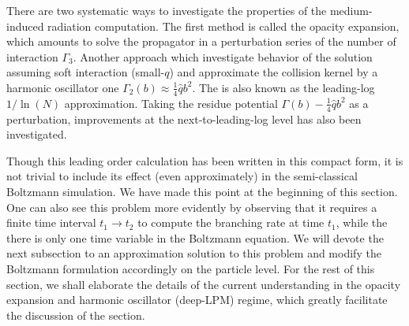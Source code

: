 There are two systematic ways to investigate the properties of the medium-induced radiation computation.
The first method is called the opacity expansion, which amounts to solve the propagator in a perturbation series of the number of interaction $\Gamma_3$. 
Another approach which investigate behavior of the solution assuming soft interaction (small-$q$) and approximate the collision kernel by a harmonic oscillator one $\Gamma_2(b) \approx \frac{1}{4}\hat{q}b^2$.
The is also known as the leading-log $1/\ln(N)$  approximation. 
Taking the residue potential $\Gamma(b) - \frac{1}{4}\hat{q}b^2$ as a perturbation, improvements at the next-to-leading-log level has also been investigated.

Though this leading order calculation has been written in this compact form, it is not trivial to include its effect (even approximately) in the semi-classical Boltzmann simulation.
We have made this point at the beginning of this section.
One can also see this problem more evidently by observing that it requires a finite time interval $t_1 \rightarrow t_2$ to compute the branching rate at time $t_1$, while the there is only one time variable in the Boltzmann equation. 
We will devote the next subsection to an approximation solution to this problem and modify the Boltzmann formulation accordingly on the particle level.
For the rest of this section, we shall elaborate the details of the current understanding in the opacity expansion and harmonic oscillator (deep-LPM) regime, which greatly facilitate the discussion of the section.

